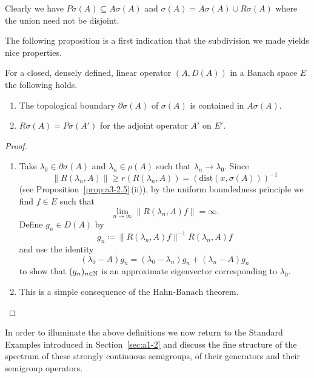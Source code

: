 Clearly we have $P\sigma(A) \subseteq A\sigma(A)$ and $\sigma(A) = A\sigma(A) \cup R\sigma(A)$ where the union need not be disjoint.

The following proposition is a first indication that the subdivision we made yields nice properties.
\begin{proposition}\label{prop:a3-2.2}
For a closed, densely defined, linear operator $(A,D(A))$ in a Banach space $E$ the following holds.
\begin{enumerate}[\upshape (i)]

\item
The topological boundary $\partial\sigma(A)$ of\/ $\sigma(A)$ is contained in $A\sigma(A)$.

\item
{}
$R\sigma(A) = P\sigma(A')$ for the adjoint operator $A'$ on $E'$.

\end{enumerate}
\end{proposition}
\begin{proof}
\begin{enumerate}[\upshape (i), wide, labelindent=.25em]

\item 
Take $\lambda_{0} \in \partial\sigma(A)$ and $\lambda_{n} \in \rho(A)$ such that $\lambda_{n} \to \lambda_{0}$.
Since 
%
\[
	 \|R(\lambda_{n},A)\| \geq r(R(\lambda_{n},A)) = (\text{dist}(x,\sigma(A)))^{-1} 
\]
%
(see Proposition~\ref{prop:a3-2.5}\,(ii)), by the uniform boundedness principle we find $f \in E$ such that
\[
	\lim_{n \to \infty}\|R(\lambda_n ,A)f\| = \infty .
\]
Define $g_{n} \in D(A)$ by
\[
g_{n} \coloneq \|R(\lambda_{n},A)f\|^{-1} R(\lambda_{n},A)f
\]
and use the identity
\[
	(\lambda_{0} - A)g_{n} = (\lambda_{0} - \lambda_{n})g_{n} + (\lambda_{n} - A)g_{n}
\]
to show that $(g_{n})_{n \in \mathbb{N}}$ is an approximate eigenvector corresponding to $\lambda_{0}$.

\item 
This is a simple consequence of the Hahn-Banach theorem.
\qedhere
\end{enumerate}
\end{proof}
In order to illuminate the above definitions we now return to the Standard Examples introduced in Section~\ref{sec:a1-2} and discuss the fine structure of the spectrum of these strongly continuous semigroups, \ie of their generators and their semigroup operators.
